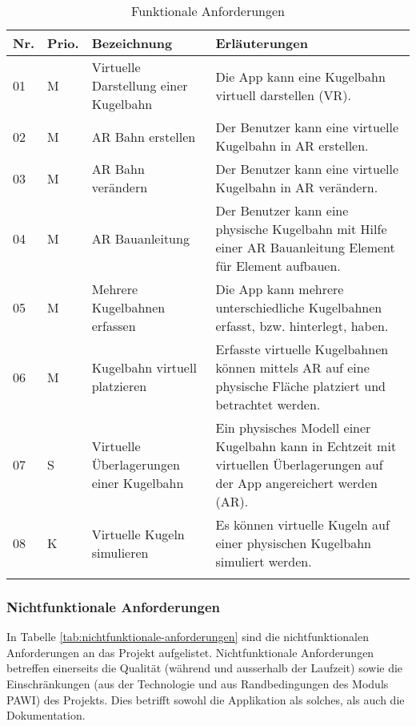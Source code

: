 \begin{longtable}{l l p{4.7cm} p{8cm}}
	\hline
	\textbf{Nr.} & \textbf{Prio.} & \textbf{Bezeichnung} & \textbf{Erläuterungen} \\
	\hline
	01 & M & Virtuelle Darstellung einer Kugelbahn & Die App kann eine Kugelbahn virtuell darstellen (VR). \\
	02 & M & AR Bahn erstellen & Der Benutzer kann eine virtuelle Kugelbahn in AR erstellen. \\
	03 & M & AR Bahn verändern & Der Benutzer kann eine virtuelle Kugelbahn in AR verändern. \\
	04 & M & AR Bauanleitung & Der Benutzer kann eine physische Kugelbahn mit Hilfe einer AR Bauanleitung Element für Element aufbauen. \\
	05 & M & Mehrere Kugelbahnen erfassen & Die App kann mehrere unterschiedliche Kugelbahnen erfasst, bzw. hinterlegt, haben. \\
	06 & M & Kugelbahn virtuell platzieren & Erfasste virtuelle Kugelbahnen können mittels AR auf eine physische Fläche platziert und betrachtet werden. \\
	07 & S & Virtuelle Überlagerungen einer Kugelbahn & Ein physisches Modell einer Kugelbahn kann in Echtzeit mit virtuellen Überlagerungen auf der App angereichert werden (AR). \\
	08 & K & Virtuelle Kugeln simulieren & Es können virtuelle Kugeln auf einer physischen Kugelbahn simuliert werden. \\
	\hline
	\caption{Funktionale Anforderungen}
	\label{tab:funktionale-anforderungen}
\end{longtable}

\subsubsection{Nichtfunktionale Anforderungen}
In Tabelle \ref{tab:nichtfunktionale-anforderungen} sind die nichtfunktionalen Anforderungen an das Projekt aufgelistet. Nichtfunktionale Anforderungen betreffen einerseits die Qualität (während und ausserhalb der Laufzeit) sowie die Einschränkungen (aus der Technologie und aus Randbedingungen des Moduls PAWI) des Projekts. Dies betrifft sowohl die Applikation als solches, als auch die Dokumentation.

